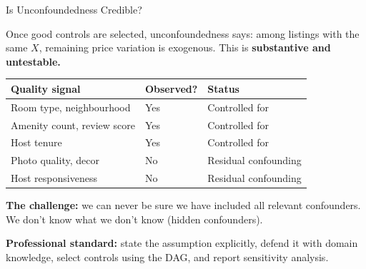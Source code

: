 \documentclass[aspectratio=169, 11pt]{beamer}
\begin{document}
\begin{frame}{Is Unconfoundedness Credible?}

Once good controls are selected, unconfoundedness says: among listings with the same $X$, remaining price variation is exogenous. This is \textbf{substantive and untestable.}

\begin{center}
\small
\begin{tabular}{lll}
\toprule
\textbf{Quality signal} & \textbf{Observed?} & \textbf{Status} \\
\midrule
Room type, neighbourhood    & \textcolor{noteblue}{Yes} & Controlled for \\
Amenity count, review score & \textcolor{noteblue}{Yes} & Controlled for \\
Host tenure                 & \textcolor{noteblue}{Yes} & Controlled for \\
Photo quality, decor        & \textcolor{warnred}{No}   & Residual confounding \\
Host responsiveness         & \textcolor{warnred}{No}   & Residual confounding \\
\bottomrule
\end{tabular}
\end{center}

\pause

\textbf{The challenge:} we can never be sure we have included all relevant confounders. We don't know what we don't know (hidden confounders).

\bigskip

\textbf{Professional standard:} state the assumption explicitly, defend it with domain knowledge, select controls using the DAG, and report sensitivity analysis.

\end{frame}
\end{document}
